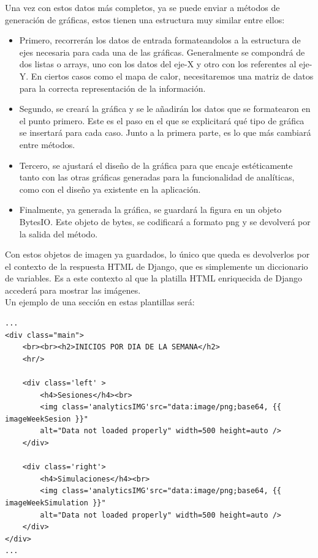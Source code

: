 \documentclass[11pt,a4paper]{book}
\begin{document}
			Una vez con estos datos más completos, ya se puede enviar a métodos de generación de gráficas, estos tienen una estructura muy similar entre ellos:
	
			\begin{itemize}
				\item Primero, recorrerán los datos de entrada formateandolos a la estructura de ejes necesaria para cada una de las gráficas. Generalmente se compondrá de dos listas o arrays, uno con los datos del eje-X y otro con los referentes al eje-Y. En ciertos casos como el mapa de calor, necesitaremos una matriz de datos para la correcta representación de la información.
				
				\item Segundo, se creará la gráfica y se le añadirán los datos que se formatearon en el punto primero. Este es el paso en el que se explicitará qué tipo de gráfica se insertará para cada caso. Junto a la primera parte, es lo que más cambiará entre métodos.
				
				\item Tercero, se ajustará el diseño de la gráfica para que encaje estéticamente tanto con las otras gráficas generadas para la funcionalidad de analíticas, como con el diseño ya existente en la aplicación.
				
				\item Finalmente, ya generada la gráfica, se guardará la figura en un objeto BytesIO. Este objeto de bytes, se codificará a formato png y se devolverá por la salida del método.
			\end{itemize}
			
			Con estos objetos de imagen ya guardados, lo único que queda es devolverlos por el contexto de la respuesta HTML de Django, que es simplemente un diccionario de variables. Es a este contexto al que la platilla HTML enriquecida de Django accederá para mostrar las imágenes.\\
						
			Un ejemplo de una sección en estas plantillas será:
			\begin{Verbatim}[tabsize=4]
...	
<div class="main">
	<br><br><h2>INICIOS POR DIA DE LA SEMANA</h2>
	<hr/>
	
	<div class='left' >
		<h4>Sesiones</h4><br>
		<img class='analyticsIMG'src="data:image/png;base64, {{ imageWeekSesion }}" 
		alt="Data not loaded properly" width=500 height=auto />
	</div>
	
	<div class='right'>
		<h4>Simulaciones</h4><br>
		<img class='analyticsIMG'src="data:image/png;base64, {{ imageWeekSimulation }}" 
		alt="Data not loaded properly" width=500 height=auto />
	</div>
</div>
...
			\end{Verbatim}
		
\end{document}
